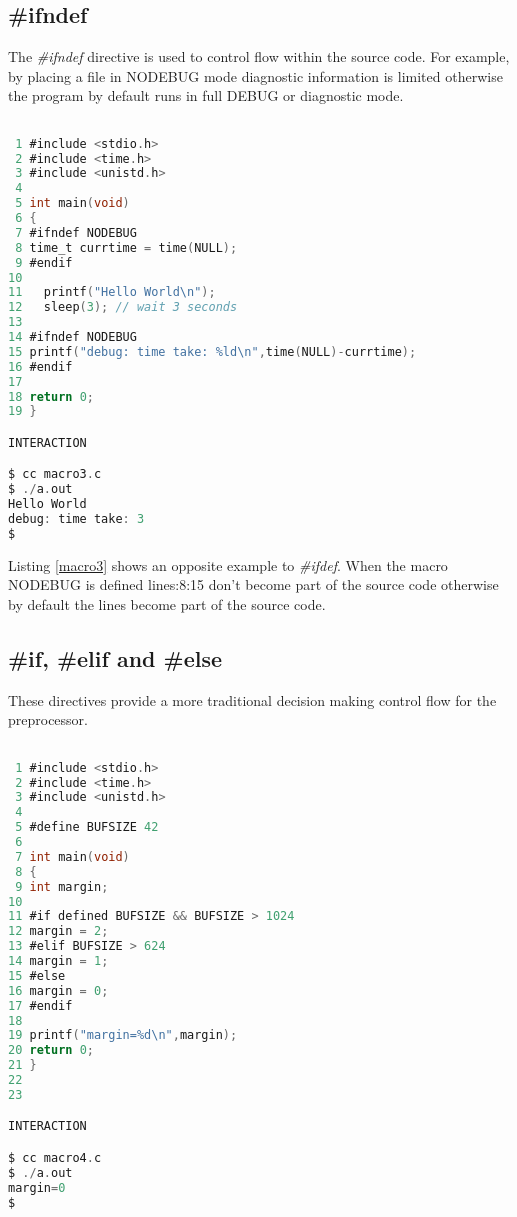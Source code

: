 \subsection{\#ifndef}


The \textit{\#ifndef} directive is used to control flow within the source code. For example, by placing a file in NODEBUG mode diagnostic information is limited otherwise the program by default runs in full DEBUG or diagnostic mode.

\begin{lstlisting}[language=C,showstringspaces=false, caption={File macro3.c, \#ifndef NODEBUG macro},captionpos=b,label=macro3]

 1 #include <stdio.h>
 2 #include <time.h>
 3 #include <unistd.h>
 4 
 5 int main(void)
 6 {
 7 #ifndef NODEBUG
 8 time_t currtime = time(NULL);
 9 #endif
10 
11   printf("Hello World\n");
12   sleep(3); // wait 3 seconds
13 
14 #ifndef NODEBUG
15 printf("debug: time take: %ld\n",time(NULL)-currtime);
16 #endif
17 
18 return 0;
19 }

INTERACTION 

$ cc macro3.c
$ ./a.out
Hello World
debug: time take: 3
$ 

\end{lstlisting}

Listing \ref{macro3} shows an opposite example to \textit{\#ifdef}. When the macro NODEBUG is defined lines:8:15 don't become part of the source code otherwise by default the lines become part of the source code.

\subsection{\#if, \#elif and \#else}


These directives provide a more traditional decision making control flow for the preprocessor.

\begin{lstlisting}[language=C,showstringspaces=false, caption={File macro4.c, using \#define macro},captionpos=b,label=macro4]

 1 #include <stdio.h>
 2 #include <time.h>
 3 #include <unistd.h>
 4 
 5 #define BUFSIZE 42
 6 
 7 int main(void)
 8 {
 9 int margin;
10 
11 #if defined BUFSIZE && BUFSIZE > 1024
12 margin = 2;
13 #elif BUFSIZE > 624
14 margin = 1;
15 #else
16 margin = 0;
17 #endif
18 
19 printf("margin=%d\n",margin);
20 return 0;
21 }
22 
23 

INTERACTION

$ cc macro4.c
$ ./a.out
margin=0
$ 

\end{lstlisting}


